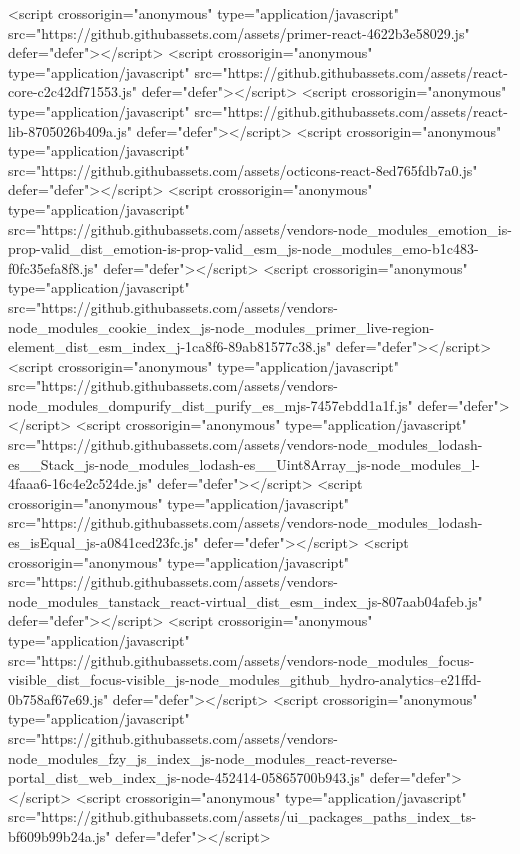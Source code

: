   <script crossorigin="anonymous" type="application/javascript" src="https://github.githubassets.com/assets/primer-react-4622b3e58029.js" defer="defer"></script>
<script crossorigin="anonymous" type="application/javascript" src="https://github.githubassets.com/assets/react-core-c2c42df71553.js" defer="defer"></script>
<script crossorigin="anonymous" type="application/javascript" src="https://github.githubassets.com/assets/react-lib-8705026b409a.js" defer="defer"></script>
<script crossorigin="anonymous" type="application/javascript" src="https://github.githubassets.com/assets/octicons-react-8ed765fdb7a0.js" defer="defer"></script>
<script crossorigin="anonymous" type="application/javascript" src="https://github.githubassets.com/assets/vendors-node_modules_emotion_is-prop-valid_dist_emotion-is-prop-valid_esm_js-node_modules_emo-b1c483-f0fc35efa8f8.js" defer="defer"></script>
<script crossorigin="anonymous" type="application/javascript" src="https://github.githubassets.com/assets/vendors-node_modules_cookie_index_js-node_modules_primer_live-region-element_dist_esm_index_j-1ca8f6-89ab81577c38.js" defer="defer"></script>
<script crossorigin="anonymous" type="application/javascript" src="https://github.githubassets.com/assets/vendors-node_modules_dompurify_dist_purify_es_mjs-7457ebdd1a1f.js" defer="defer"></script>
<script crossorigin="anonymous" type="application/javascript" src="https://github.githubassets.com/assets/vendors-node_modules_lodash-es__Stack_js-node_modules_lodash-es__Uint8Array_js-node_modules_l-4faaa6-16c4e2c524de.js" defer="defer"></script>
<script crossorigin="anonymous" type="application/javascript" src="https://github.githubassets.com/assets/vendors-node_modules_lodash-es_isEqual_js-a0841ced23fc.js" defer="defer"></script>
<script crossorigin="anonymous" type="application/javascript" src="https://github.githubassets.com/assets/vendors-node_modules_tanstack_react-virtual_dist_esm_index_js-807aab04afeb.js" defer="defer"></script>
<script crossorigin="anonymous" type="application/javascript" src="https://github.githubassets.com/assets/vendors-node_modules_focus-visible_dist_focus-visible_js-node_modules_github_hydro-analytics--e21ffd-0b758af67e69.js" defer="defer"></script>
<script crossorigin="anonymous" type="application/javascript" src="https://github.githubassets.com/assets/vendors-node_modules_fzy_js_index_js-node_modules_react-reverse-portal_dist_web_index_js-node-452414-05865700b943.js" defer="defer"></script>
<script crossorigin="anonymous" type="application/javascript" src="https://github.githubassets.com/assets/ui_packages_paths_index_ts-bf609b99b24a.js" defer="defer"></script>
